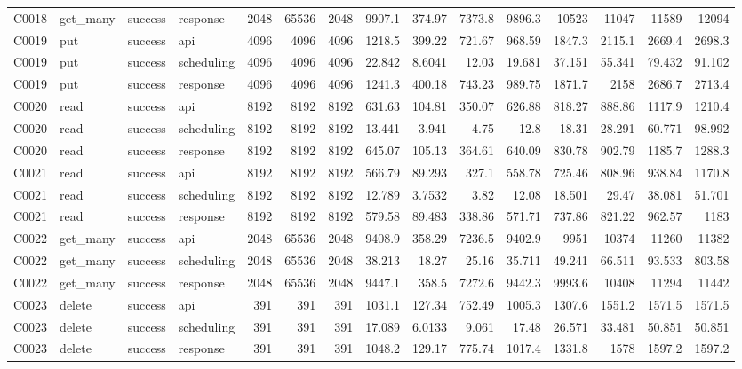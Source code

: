 \begin{landscape}
\begin{longtable}{llllrrrrrrrrrrr}
C0018 & get\_\allowbreak{}many & success & response & 2048 & 65536 & 2048 & 9907.1 & 374.97 & 7373.8 & 9896.3 & 10523 & 11047 & 11589 & 12094\\
C0019 & put & success & api & 4096 & 4096 & 4096 & 1218.5 & 399.22 & 721.67 & 968.59 & 1847.3 & 2115.1 & 2669.4 & 2698.3\\
C0019 & put & success & scheduling & 4096 & 4096 & 4096 & 22.842 & 8.6041 & 12.03 & 19.681 & 37.151 & 55.341 & 79.432 & 91.102\\
C0019 & put & success & response & 4096 & 4096 & 4096 & 1241.3 & 400.18 & 743.23 & 989.75 & 1871.7 & 2158 & 2686.7 & 2713.4\\
C0020 & read & success & api & 8192 & 8192 & 8192 & 631.63 & 104.81 & 350.07 & 626.88 & 818.27 & 888.86 & 1117.9 & 1210.4\\
C0020 & read & success & scheduling & 8192 & 8192 & 8192 & 13.441 & 3.941 & 4.75 & 12.8 & 18.31 & 28.291 & 60.771 & 98.992\\
C0020 & read & success & response & 8192 & 8192 & 8192 & 645.07 & 105.13 & 364.61 & 640.09 & 830.78 & 902.79 & 1185.7 & 1288.3\\
C0021 & read & success & api & 8192 & 8192 & 8192 & 566.79 & 89.293 & 327.1 & 558.78 & 725.46 & 808.96 & 938.84 & 1170.8\\
C0021 & read & success & scheduling & 8192 & 8192 & 8192 & 12.789 & 3.7532 & 3.82 & 12.08 & 18.501 & 29.47 & 38.081 & 51.701\\
C0021 & read & success & response & 8192 & 8192 & 8192 & 579.58 & 89.483 & 338.86 & 571.71 & 737.86 & 821.22 & 962.57 & 1183\\
C0022 & get\_\allowbreak{}many & success & api & 2048 & 65536 & 2048 & 9408.9 & 358.29 & 7236.5 & 9402.9 & 9951 & 10374 & 11260 & 11382\\
C0022 & get\_\allowbreak{}many & success & scheduling & 2048 & 65536 & 2048 & 38.213 & 18.27 & 25.16 & 35.711 & 49.241 & 66.511 & 93.533 & 803.58\\
C0022 & get\_\allowbreak{}many & success & response & 2048 & 65536 & 2048 & 9447.1 & 358.5 & 7272.6 & 9442.3 & 9993.6 & 10408 & 11294 & 11442\\
C0023 & delete & success & api & 391 & 391 & 391 & 1031.1 & 127.34 & 752.49 & 1005.3 & 1307.6 & 1551.2 & 1571.5 & 1571.5\\
C0023 & delete & success & scheduling & 391 & 391 & 391 & 17.089 & 6.0133 & 9.061 & 17.48 & 26.571 & 33.481 & 50.851 & 50.851\\
C0023 & delete & success & response & 391 & 391 & 391 & 1048.2 & 129.17 & 775.74 & 1017.4 & 1331.8 & 1578 & 1597.2 & 1597.2\\

\end{longtable}
\end{landscape}
